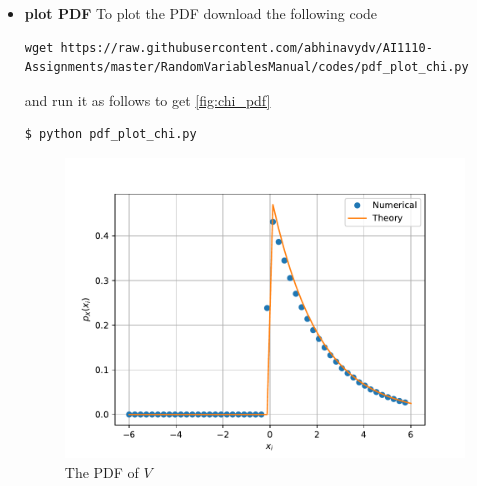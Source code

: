 \documentclass[journal,12pt,twocolumn]{IEEEtran}
\renewcommand\thesection{\arabic{section}}
\begin{document}
\begin{enumerate}[label=\thesection.\arabic*
        ,ref=\thesection.\theenumi]
\begin{itemize}
              \item \textbf{plot PDF}
                    To plot the PDF download the following code
                    \begin{lstlisting}
wget https://raw.githubusercontent.com/abhinavydv/AI1110-Assignments/master/RandomVariablesManual/codes/pdf_plot_chi.py
\end{lstlisting}
                    and run it as follows to get \autoref{fig:chi_pdf}
                    \begin{lstlisting}
$ python pdf_plot_chi.py
\end{lstlisting}
                    \begin{figure}
                        \centering
                        \includegraphics[width=\columnwidth]{./figs/chi_pdf}
                        \caption{The PDF of $V$}
                        \label{fig:chi_pdf}
                    \end{figure}

          \end{itemize}



\end{enumerate}
\end{document}
